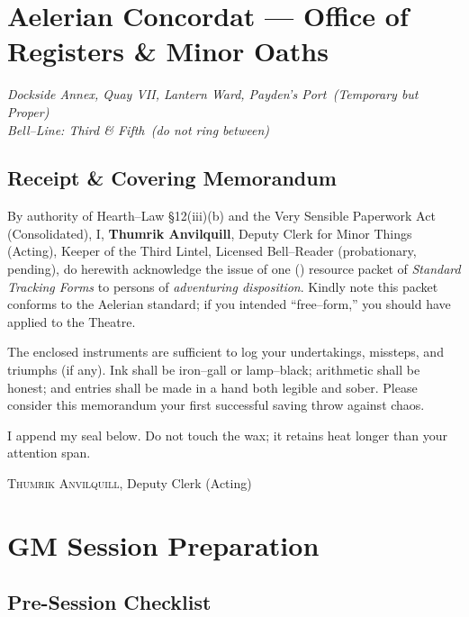 \documentclass[11pt,letterpaper]{article}
\begin{document}
\maketitle
\thispagestyle{fancy}
\tableofcontents
\newpage

\section*{Aelerian Concordat — Office of Registers \& Minor Oaths}

\noindent\textit{Dockside Annex, Quay VII, Lantern Ward, Payden’s Port \,(Temporary but Proper)}\\
\textit{Bell–Line: Third \& Fifth \,(do not ring between)}

\subsection*{Receipt \& Covering Memorandum}
\noindent By authority of Hearth–Law §12(iii)(b) and the Very Sensible Paperwork Act (Consolidated), I, \textbf{Thumrik Anvilquill}, Deputy Clerk for Minor Things (Acting), Keeper of the Third Lintel, Licensed Bell–Reader (probationary, pending), do herewith acknowledge the issue of one () resource packet of \emph{Standard Tracking Forms} to persons of \emph{adventuring disposition}. Kindly note this packet conforms to the Aelerian standard; if you intended “free–form,” you should have applied to the Theatre.

\medskip
\noindent The enclosed instruments are sufficient to log your undertakings, missteps, and triumphs (if any). Ink shall be iron–gall or lamp–black; arithmetic shall be honest; and entries shall be made in a hand both legible and sober. Please consider this memorandum your first successful saving throw against chaos.

\medskip
\noindent I append my seal below. Do not touch the wax; it retains heat longer than your attention span.

\hfill\textsc{Thumrik Anvilquill}, Deputy Clerk (Acting)

\section{GM Session Preparation}

\subsection{Pre-Session Checklist}
\end{document}
